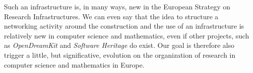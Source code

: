 Such an infrastructure is, in many ways, new in the European Strategy
on Research Infrastructures. We can even say that the idea to
structure a networking activity around the construction and the use
of an infrastructure is relatively new in computer science and
mathematics, even if other projects, such as {\em OpenDreamKit} and
{\em Software Heritage} do exist. Our goal is therefore also trigger a
little, but significative, evolution on the organization of research
in computer science and mathematics in Europe.

